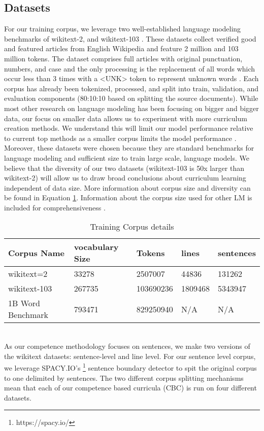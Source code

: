 \subsection{Datasets}
For our training corpus, we leverage two well-established language modeling benchmarks of wikitext-2, and wikitext-103 \cite{Merity2016PointerSM}. These datasets collect verified good and featured articles from English Wikipedia and feature 2 million and 103 million tokens. The dataset comprises full articles with original punctuation, numbers, and case and the only processing is the replacement of all words which occur less than 3 times with a <UNK> token to represent unknown words . Each corpus has already been tokenized, processed, and split into train, validation, and evaluation components (80:10:10 based on splitting the source documents). While most other research on language modeling has been focusing on bigger and bigger data, our focus on smaller data allows us to experiment with more curriculum creation methods. We understand this will limit our model performance relative to current top methods as a smaller corpus limits the model performance \cite{Kaplan2020ScalingLF}. Moreover, these datasets were chosen because they are standard benchmarks for language modeling and sufficient size to train large scale, language models. We believe that the diversity of our two datasets (wikitext-103 is 50x larger than wikitext-2) will allow us to draw broad conclusions about curriculum learning independent of data size. More information about corpus size and diversity can be found in Equation \ref{table:corpussize}. Information about the corpus size used for other LM is included for comprehensiveness \cite{Chelba2014OneBW}.\\
\begin{table}[h!]
\begin{tabular}{|l|l|l|l|l|} \hline
\textbf{Corpus Name} & \textbf{vocabulary Size} & \textbf{Tokens} & \textbf{lines} & \textbf{sentences} \\ \hline
wikitext=2 & 33278 & 2507007 & 44836 & 131262 \\ \hline
wikitext-103 & 267735 & 103690236 & 1809468  & 5343947 \\ \hline
1B Word Benchmark & 793471 & 829250940 & N/A & N/A \\ \hline
\end{tabular}
\caption{Training Corpus details}
\label{table:corpussize}
\end{table} \\
As our competence methodology focuses on sentences, we make two versions of the wikitext datasets: sentence-level and line level. For our sentence level corpus, we leverage SPACY.IO's \cite{spacy2} \footnote{https://spacy.io/} sentence boundary detector to spit the original corpus to one delimited by sentences. The two different corpus splitting mechanisms mean that each of our competence based curricula (CBC) is run on four different datasets.
